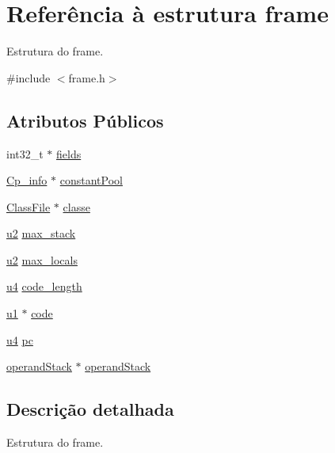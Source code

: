 \hypertarget{structframe}{}\section{Referência à estrutura frame}
\label{structframe}


Estrutura do frame.  




{\ttfamily \#include $<$frame.\+h$>$}

\subsection*{Atributos Públicos}
\begin{DoxyCompactItemize}
\item 
int32\+\_\+t $\ast$ \hyperlink{structframe_abd74d70b2c953c57da3820ef8bfd152f}{fields}
\item 
\hyperlink{struct_cp__info}{Cp\+\_\+info} $\ast$ \hyperlink{structframe_a40e472a4fefc83b9b6920b4c3d0c3b89}{constant\+Pool}
\item 
\hyperlink{struct_class_file}{Class\+File} $\ast$ \hyperlink{structframe_ac199820b516dd4d579068706cd43af95}{classe}
\item 
\hyperlink{util_8h_a55ef8d87fd202b8417704c089899c5b9}{u2} \hyperlink{structframe_a0c15fcc6d1f7224dddf9e6539c8cf9d3}{max\+\_\+stack}
\item 
\hyperlink{util_8h_a55ef8d87fd202b8417704c089899c5b9}{u2} \hyperlink{structframe_a2f8c0cb2b381617b0065066918344dbf}{max\+\_\+locals}
\item 
\hyperlink{util_8h_ae391a1d79bb0c8cbc283f0283e3c098b}{u4} \hyperlink{structframe_a6aecdb355da5ec8d1393bb3bed5fac56}{code\+\_\+length}
\item 
\hyperlink{util_8h_a64f8055b64cf2a4c299c841130c5c938}{u1} $\ast$ \hyperlink{structframe_a5df0e7929808221d8109562c16e490fc}{code}
\item 
\hyperlink{util_8h_ae391a1d79bb0c8cbc283f0283e3c098b}{u4} \hyperlink{structframe_ae2f8c8d0abb0ff0952fb8ab971c2d3d0}{pc}
\item 
\hyperlink{structoperand_stack}{operand\+Stack} $\ast$ \hyperlink{structframe_a2247e2a31594f7c5b3f6de0f6dc4ca18}{operand\+Stack}
\end{DoxyCompactItemize}


\subsection{Descrição detalhada}
Estrutura do frame. 

